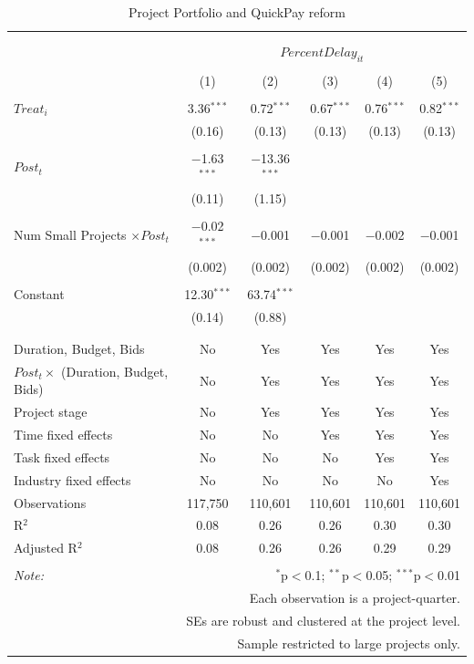 \documentclass[
]{article}
\begin{document}
\begin{table}[H] \centering 
  \caption{Project Portfolio and QuickPay reform} 
  \label{} 
\small 
\begin{tabular}{@{\extracolsep{-10pt}}lccccc} 
\\[-1.8ex]\hline 
\hline \\[-1.8ex] 
\\[-1.8ex] & \multicolumn{5}{c}{$PercentDelay_{it}$} \\ 
\\[-1.8ex] & (1) & (2) & (3) & (4) & (5)\\ 
\hline \\[-1.8ex] 
 $Treat_i$ & 3.36$^{***}$ & 0.72$^{***}$ & 0.67$^{***}$ & 0.76$^{***}$ & 0.82$^{***}$ \\ 
  & (0.16) & (0.13) & (0.13) & (0.13) & (0.13) \\ 
  & & & & & \\ 
 $Post_t$ & $-$1.63$^{***}$ & $-$13.36$^{***}$ &  &  &  \\ 
  & (0.11) & (1.15) &  &  &  \\ 
  & & & & & \\ 
 Num Small Projects $\times Post_t$ & $-$0.02$^{***}$ & $-$0.001 & $-$0.001 & $-$0.002 & $-$0.001 \\ 
  & (0.002) & (0.002) & (0.002) & (0.002) & (0.002) \\ 
  & & & & & \\ 
 Constant & 12.30$^{***}$ & 63.74$^{***}$ &  &  &  \\ 
  & (0.14) & (0.88) &  &  &  \\ 
  & & & & & \\ 
\hline \\[-1.8ex] 
Duration, Budget, Bids & No & Yes & Yes & Yes & Yes \\ 
$Post_t \times $  (Duration, Budget, Bids) & No & Yes & Yes & Yes & Yes \\ 
Project stage & No & Yes & Yes & Yes & Yes \\ 
Time fixed effects & No & No & Yes & Yes & Yes \\ 
Task fixed effects & No & No & No & Yes & Yes \\ 
Industry fixed effects & No & No & No & No & Yes \\ 
Observations & 117,750 & 110,601 & 110,601 & 110,601 & 110,601 \\ 
R$^{2}$ & 0.08 & 0.26 & 0.26 & 0.30 & 0.30 \\ 
Adjusted R$^{2}$ & 0.08 & 0.26 & 0.26 & 0.29 & 0.29 \\ 
\hline 
\hline \\[-1.8ex] 
\textit{Note:}  & \multicolumn{5}{r}{$^{*}$p$<$0.1; $^{**}$p$<$0.05; $^{***}$p$<$0.01} \\ 
 & \multicolumn{5}{r}{Each observation is a project-quarter.} \\ 
 & \multicolumn{5}{r}{SEs are robust and clustered at the project level.} \\ 
 & \multicolumn{5}{r}{Sample restricted to large projects only.} \\ 
\end{tabular} 
\end{table}
\end{document}
